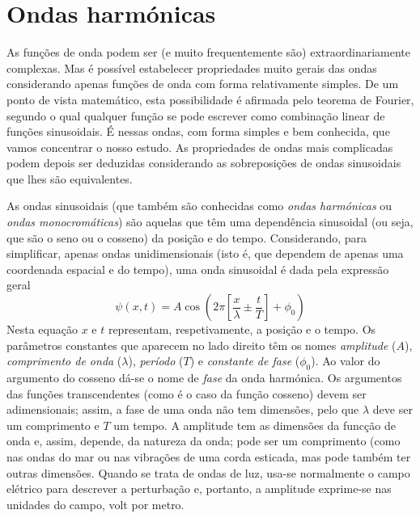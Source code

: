 \section{Ondas harmónicas}
As funções de onda podem ser (e muito frequentemente são) extraordinariamente
complexas. Mas é possível estabelecer propriedades muito gerais das ondas
considerando apenas funções de onda com forma relativamente simples. De um ponto
de vista matemático, esta possibilidade é afirmada pelo teorema de Fourier,
segundo o qual qualquer função se pode escrever como combinação linear de
funções sinusoidais. É nessas ondas, com forma simples e bem conhecida, que
vamos concentrar o nosso estudo. As propriedades de ondas mais complicadas podem
depois ser deduzidas considerando as sobreposições de ondas sinusoidais que lhes
são equivalentes.

As ondas sinusoidais (que também são conhecidas como \emph{ondas harmónicas} ou
\emph{ondas monocro\-máticas}) são aquelas que têm uma dependência sinusoidal (ou
seja, que são o seno ou o cosseno) da posição e do tempo. Considerando, para
simplificar, apenas ondas unidimensionais (isto é, que dependem de apenas uma
coordenada espacial e do tempo), uma onda sinusoidal é dada pela
expressão geral
\begin{equation}\label{eq:hwav}
    \psi(x,t)=A\cos\left(2\pi\left[\frac{x}{\lambda}\pm \frac{t}{T}\right]+
            \phi_0\right)
\end{equation}
Nesta equação $x$ e $t$ representam, respetivamente, a posição e o tempo. Os
parâmetros  constantes que aparecem no lado direito têm os nomes
\emph{amplitude} ($A$), \emph{comprimento de onda} ($\lambda$), \emph{período}
($T$) e \emph{constante de fase} ($\phi_0$). Ao valor do argumento do cosseno
dá-se o nome de \emph{fase} da onda harmónica. Os argumentos das funções
transcendentes (como é o caso da função cosseno) devem ser adimensionais; assim,
a fase de uma onda não tem dimensões, pelo que $\lambda$ deve ser um comprimento
e $T$ um tempo. A amplitude tem as dimensões da funcção de onda e, assim,
depende, da natureza da onda; pode ser um comprimento (como nas ondas do mar ou
nas vibrações de uma corda esticada, mas pode também ter outras dimensões.
Quando se trata de ondas de luz, usa-se normalmente o campo elétrico para
descrever a perturbação e, portanto, a amplitude exprime-se nas unidades do
campo, volt por metro.

